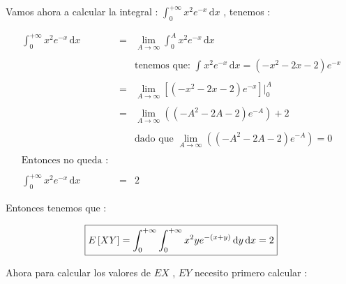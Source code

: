 \documentclass[12pt]{article}
\begin{document}
    \begin{flushleft}
        Vamos ahora a calcular la integral : $\displaystyle \int_{0}^{+\infty} x^2e^{-x}  \,\mathrm{d}x$ , tenemos : 
    \end{flushleft}

    \begin{equation*}
        \begin{array}{rcl}
            \displaystyle \int_{0}^{+\infty} x^2e^{-x}  \,\mathrm{d}x & = & \displaystyle \lim_{A \to \infty} \int_{0}^{A} x^2e^{-x}  \,\mathrm{d}x  
            \\
            \\
            && \mbox{tenemos que: $\displaystyle \int_{}^{} x^2e^{-x}  \,\mathrm{d}x = \left(-x^2 -2x -2 \right)e^{-x}$}
            \\
            \\
            & = &\displaystyle \lim_{A \to \infty}  \left[\left(-x^2 -2x -2 \right)e^{-x}\right] \vert_{0}^{A}
            \\
            \\
            & = &\displaystyle  \lim_{A \to \infty}  \left(\left(-A^2 -2A -2 \right)e^{-A}\right) + 2 
            \\
            \\
            && \mbox{dado que $\displaystyle  \lim_{A \to \infty}  \left(\left(-A^2 -2A -2 \right)e^{-A}\right) = 0  $}
            \\
            \\
            \mbox{Entonces no queda : } &&
            \\
            \\
            \displaystyle \int_{0}^{+\infty} x^2e^{-x}  \,\mathrm{d}x  & = & 2 
        \end{array}
    \end{equation*}

    \begin{flushleft}
        Entonces tenemos que : 
    \end{flushleft}

    \begin{equation*}
        \fbox{$
            E\left[XY\right] = \displaystyle \int_{0}^{+\infty} \int_{0}^{+\infty} x^2ye^{-\left(x+y\right)} \,\mathrm{d}y  \,\mathrm{d}x = 2
        $}
    \end{equation*}

    \vspace{1cm}

    \begin{flushleft}
        Ahora para calcular los valores de $EX$ , $EY$ necesito primero calcular :
    \end{flushleft}
\end{document}
